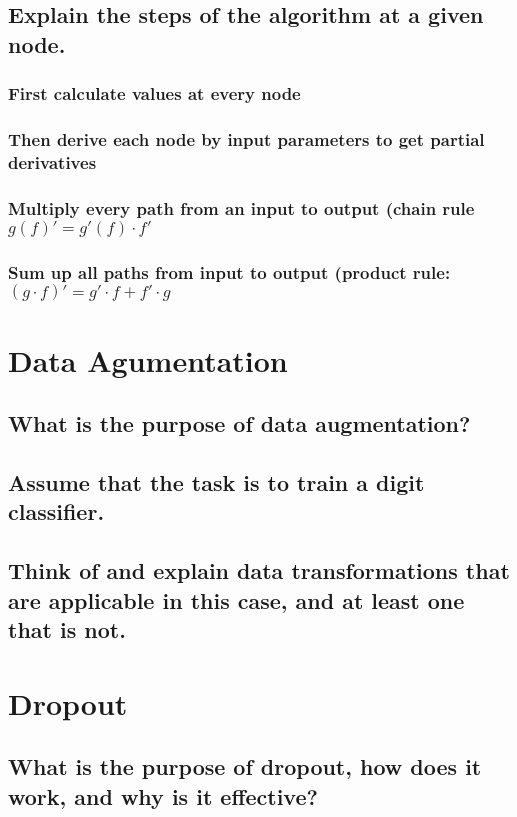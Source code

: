 \subsection{Explain the steps of the algorithm at a given node.}

\subsubsection{ First calculate values at every node}

\subsubsection{ Then derive each node by input parameters to get partial derivatives}

\subsubsection{ Multiply every path from an input to output (chain rule $g(f)' = g'(f)\cdot f'$}

\subsubsection{ Sum up all paths from input to output (product rule: $(g\cdot f)' = g'\cdot f + f'\cdot g$}
\section{Data Agumentation}
\subsection{What is the purpose of data augmentation?}
\subsection{Assume that the task is to train a digit classifier.}
\subsection{Think of and explain data transformations that are applicable in this case, and at least one that is not.}

\section{Dropout}
\subsection{What is the purpose of dropout, how does it work, and why is it effective?}
